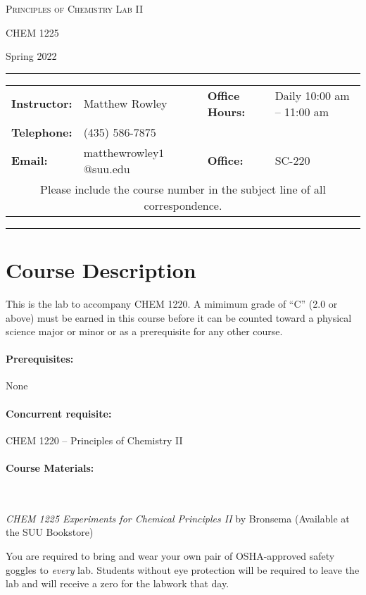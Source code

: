 \documentclass[12pt, letterpaper]{article}
\begin{document}
\begin{center}
	{\Large \textsc{Principles of Chemistry Lab II}}

	CHEM 1225
\end{center}

\begin{center}
	{\large Spring 2022}
\end{center}
\begin{center}
	\rule{0.99\textwidth}{0.4pt}
	\begin{tabular}{llcll}
		\textbf{Instructor:} & Matthew Rowley           &  & \textbf{Office Hours:} & Daily 10:00 am -- 11:00 am \\
		\textbf{Telephone:}  & (435) 586-7875           &  &                        &                            \\
		\textbf{Email:}      & matthewrowley$1$@suu.edu &  & \textbf{Office:}       & SC-220                     \\
		\multicolumn{5}{c}{Please include the course number in the subject line of all correspondence.}
	\end{tabular}
	\rule{0.99\textwidth}{0.4pt}
\end{center}

\section*{Course Description}
This is the lab to accompany CHEM 1220. A mimimum grade of ``C'' (2.0 or above) must be earned in this course before it can be counted toward a physical science major or minor or as a prerequisite for any other course.

\paragraph{Prerequisites:}
None

\paragraph{Concurrent requisite:}
CHEM 1220 -- Principles of Chemistry II

\paragraph{Course Materials:} ~

\emph{CHEM 1225 Experiments for Chemical Principles II} by Bronsema (Available at the SUU Bookstore)

You are required to bring and wear your own pair of OSHA-approved safety goggles to \emph{every} lab. Students without eye protection will be required to leave the lab and will receive a zero for the labwork that day.
\end{document}
